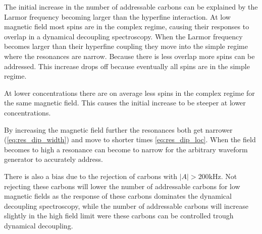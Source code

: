 The initial increase in the number of addressable carbons can be explained by the Larmor frequency becoming larger than the hyperfine interaction.
At low magnetic field most spins are in the complex regime, causing their responses to overlap in a dynamical decoupling spectroscopy.
When the Larmor frequency becomes larger than their hyperfine coupling they move into the simple regime where the resonances are narrow.
Because there is less overlap more spins can be addressed.
This increase drops off because eventually all spins are in the simple regime.

At lower concentrations there are on average less spins in the complex regime for the same magnetic field.
This causes the initial increase to be steeper at lower concentrations.

By increasing the magnetic field further the resonances both get narrower (\cref{eq:res_dip_width}) and move to shorter times \cref{eq:res_dip_loc}.
When the field becomes to high a resonance can become to narrow for the arbitrary waveform generator to accurately address.

There is also a bias due to the rejection of carbons with $|A|>200\mathrm{kHz}$.
Not rejecting these carbons will lower the number of addressable carbons for low magnetic fields as the response of these carbons dominates the dynamical decoupling spectroscopy, while the number of addressable carbons will increase slightly in the high field limit were these carbons can be controlled trough dynamical decoupling.

